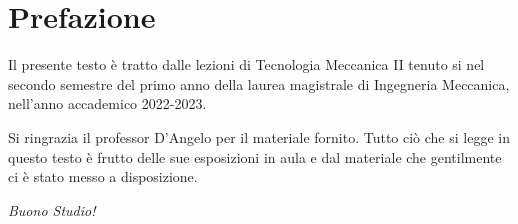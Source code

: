\chapter{Prefazione}
Il presente testo è tratto dalle lezioni di Tecnologia Meccanica II tenuto si nel secondo semestre del primo anno della laurea magistrale di Ingegneria Meccanica, nell'anno accademico 2022-2023.

Si ringrazia il professor D'Angelo per il materiale fornito.
Tutto ciò che si legge in questo testo è frutto delle sue esposizioni in aula e dal materiale che gentilmente ci è stato messo a disposizione.

\begin{center}
\textit{Buono Studio!}
\end{center}